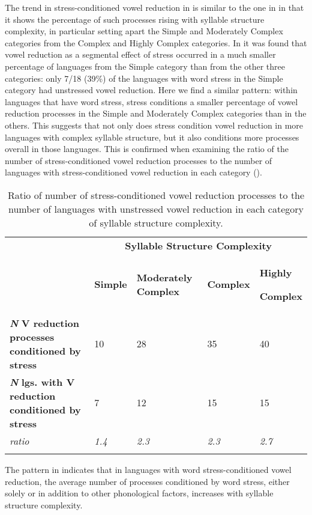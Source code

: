   The trend in stress-conditioned vowel reduction in  is similar to the one in  in that it shows the percentage of such processes rising with syllable structure complexity, in particular setting apart the Simple and Moderately Complex categories from the Complex and Highly Complex categories. In  it was found that vowel reduction as a segmental effect of stress occurred in a much smaller percentage of languages from the Simple category than from the other three categories: only 7/18 (39\%) of the languages with word stress in the Simple category had unstressed vowel reduction. Here we find a similar pattern: within languages that have word stress, stress conditions a smaller percentage of vowel reduction processes in the Simple and Moderately Complex categories than in the others. This suggests that not only does stress condition vowel reduction in more languages with complex syllable structure, but it also conditions more processes overall in those languages. This is confirmed when examining the ratio of the number of stress-conditioned vowel reduction processes to the number of languages with stress-conditioned vowel reduction in each category ().

\begin{table}
\begin{tabularx}{\textwidth}{XXXXX}
\lsptoprule
 & \multicolumn{4}{c}{ \textbf{Syllable Structure Complexity}}\\
& \textbf{Simple} & \textbf{Moderately Complex} & \textbf{Complex} & { \textbf{Highly} }

 \textbf{Complex}\\
 \textbf{\textit{N}} \textbf{V reduction processes conditioned by stress} & 10 & 28 & 35 & 40\\
 \textbf{\textit{N}} \textbf{lgs. with V reduction conditioned by stress} & 7 & 12 & 15 & 15\\
 \textit{ratio} & \textit{1.4} & \textit{2.3} & \textit{2.3} & \textit{2.7}\\
\lspbottomrule
\end{tabularx}
\caption{\label{tab:6.7}Ratio of number of stress-conditioned vowel reduction processes to the number of languages with unstressed vowel reduction in each category of syllable structure complexity.}
\end{table}

  The pattern in  indicates that in languages with word stress-conditioned vowel reduction, the average number of processes conditioned by word stress, either solely or in addition to other phonological factors, increases with syllable structure complexity.

